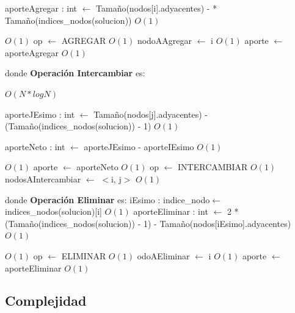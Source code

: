 \documentclass[a4paper, 10pt, twoside]{article}
\newenvironment{pseudo}[1][]{%
    \vspace{1em}%
    \begin{algorithmic}%
}
{%
    \end{algorithmic}%
    \vspace{1em}%
}
\newcommand{\Ode}[1]{\hfill $O(#1)$}
\begin{document}
\begin{pseudo}
				\State aporteAgregar : int $\leftarrow$ Tamaño(nodos[i].adyacentes) -
				 * Tamaño(indices\_nodos(solucion))															\Ode{1}

																						\Ode{1}
					\State op $\leftarrow$ AGREGAR 																	\Ode{1}
					\State nodoAAgregar $\leftarrow$ i 																\Ode{1}
					\State aporte $\leftarrow$ aporteAgregar														\Ode{1}
				\EndIf
			\EndIf
		\EndFor

\State
\State donde \textbf{Operación Intercambiar} es:
\State

											\Ode{N*log N}

					\State aporteJEsimo : int $\leftarrow$ Tamaño(nodos[j].adyacentes) -
					\State (Tamaño(indices\_nodos(solucion)) - 1)															\Ode{1}

					\State aporteNeto : int $\leftarrow$ aporteJEsimo - aporteIEsimo										\Ode{1}

																									\Ode{1}
						\State aporte $\leftarrow$ aporteNeto																\Ode{1}
						\State op $\leftarrow$ INTERCAMBIAR 																\Ode{1}
						\State nodosAIntercambiar $\leftarrow$ $<$i, j$>$ 													\Ode{1}
					\EndIf
				\EndIf
			\EndFor	

\State
\State donde \textbf{Operación Eliminar} es:
\State
			\State iEsimo : indice\_nodo$\leftarrow$ indices\_nodos(solucion)[i]											\Ode{1}
			\State aporteEliminar : int $\leftarrow$ 2 * (Tamaño(indices\_nodos(solucion)) - 1) - 
			\State Tamaño(nodos[iEsimo].adyacentes)																			\Ode{1}

																								\Ode{1}
				\State op $\leftarrow$ ELIMINAR 																			\Ode{1}
				\State odoAEliminar $\leftarrow$ i 																			\Ode{1}
				\State aporte $\leftarrow$ aporteEliminar 																	\Ode{1}
			\EndIf
		\EndFor


\end{pseudo}

\subsection{Complejidad}
\end{document}
